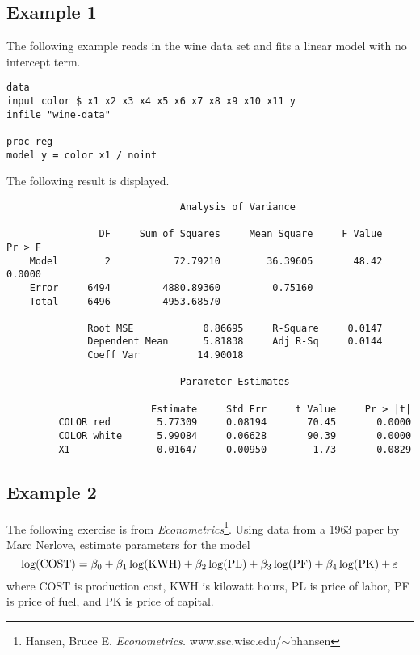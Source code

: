 \documentclass[12pt]{article}
\begin{document}
\subsection*{Example 1}
The following example reads in the wine data set and fits
a linear model with no intercept term.

\begin{Verbatim}
data
input color $ x1 x2 x3 x4 x5 x6 x7 x8 x9 x10 x11 y
infile "wine-data"

proc reg
model y = color x1 / noint
\end{Verbatim}

The following result is displayed.

\begin{Verbatim}
                              Analysis of Variance

                DF     Sum of Squares     Mean Square     F Value     Pr > F
    Model        2           72.79210        36.39605       48.42     0.0000
    Error     6494         4880.89360         0.75160                       
    Total     6496         4953.68570                                       

              Root MSE            0.86695     R-Square     0.0147
              Dependent Mean      5.81838     Adj R-Sq     0.0144
              Coeff Var          14.90018                        

                              Parameter Estimates

                         Estimate     Std Err     t Value     Pr > |t|
         COLOR red        5.77309     0.08194       70.45       0.0000
         COLOR white      5.99084     0.06628       90.39       0.0000
         X1              -0.01647     0.00950       -1.73       0.0829
\end{Verbatim}

\subsection*{Example 2}
The following exercise is from {\it Econometrics}\footnote{
Hansen, Bruce E. {\it Econometrics.}
www.ssc.wisc.edu/$\sim$bhansen}.
Using data from a 1963 paper by Marc Nerlove,
estimate parameters for the model
\[
\log({\rm COST})=\beta_0+\beta_1\log({\rm KWH})
+\beta_2\log({\rm PL})+\beta_3\log({\rm PF})+\beta_4\log({\rm PK})
+\varepsilon
\]
where COST is production cost,
KWH is kilowatt hours,
PL is price of labor,
PF is price of fuel,
and PK is price of capital.
\end{document}
